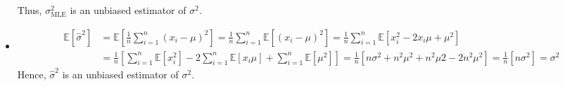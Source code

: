 \begin{itemize}
			Thus, $\sigma_{\text{MLE}}^{2}$ is an unbiased estimator of $\sigma^{2}$.
		\item
			\begin{align*}
				\mathbb{E}[\hat{\sigma}^{2}] & = \mathbb{E} \left[ \frac{1}{n} \sum_{i=1}^{n} (x_{i} - \mu)^{2}	\right]
				= \frac{1}{n} \sum_{i=1}^{n} \mathbb{E} \left[ (x_{i} - \mu)^{2}	\right]
				= \frac{1}{n} \sum_{i=1}^{n} \mathbb{E} \left[ x_{i}^{2} - 2x_{i}\mu + \mu^{2} \right] \\
				& = \frac{1}{n} \left[ \sum_{i=1}^{n} \mathbb{E}[x_{i}^{2}] - 2 \sum_{i=1}^{n} \mathbb{E}[x_{i}\mu] + \sum_{i=1}^{n} \mathbb{E}[\mu^{2}] \right]
				= \frac{1}{n} [n\sigma^{2} + n^{2}\mu^{2} + n^{2}\mu{2} - 2n^{2}\mu^{2}]
				= \frac{1}{n} [n\sigma^{2}] = \sigma^{2}
			\end{align*}
			Hence, $\hat{\sigma}^{2}$ is an unbiased estimator of $\sigma^{2}$.
	\end{itemize}
